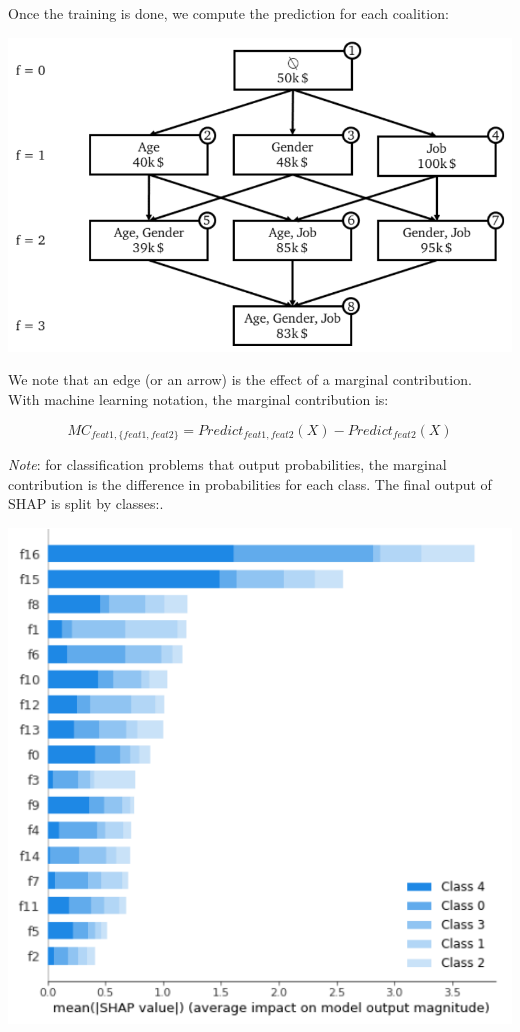 Once the training is done, we compute the prediction for each coalition:

\begin{center}
\includegraphics[scale=0.35]{powerset_2.png}
\end{center}

We note that an edge (or an arrow) is the effect of a marginal contribution. \\

With machine learning notation, the marginal contribution is:

$$MC_{feat 1, \{feat 1, feat 2\}} = Predict_{feat 1, feat 2}(X) - Predict_{feat 2}(X)$$

\textit{Note}: for classification problems that output probabilities, the marginal contribution is the difference in probabilities for each class. The final output of SHAP is split by classes:.

\begin{center}
\includegraphics[scale=0.30]{shap_classification.png}
\end{center}

